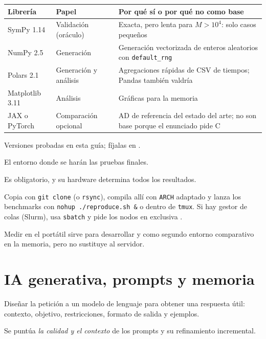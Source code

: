 \begin{center}\small
\begin{tabularx}{\linewidth}{@{}l l X@{}}
\toprule
Librería & Papel & Por qué sí o por qué no como base \\
\midrule
SymPy 1.14 & Validación (oráculo) & Exacta, pero lenta para $M>10^4$: solo casos pequeños \\
NumPy 2.5 & Generación & Generación vectorizada de enteros aleatorios con \texttt{default\_rng} \\
Polars 2.1 & Generación y análisis & Agregaciones rápidas de CSV de tiempos; Pandas también valdría \\
Matplotlib 3.11 & Análisis & Gráficas para la memoria \\
JAX o PyTorch & Comparación opcional & AD de referencia del estado del arte; no son base porque el enunciado pide C \\
\bottomrule
\end{tabularx}
\end{center}
Versiones probadas en esta guía; fíjalas en .

\que El entorno donde se harán las pruebas finales.

\porque Es obligatorio, y su hardware determina todos los resultados.

\como Copia con \texttt{git clone} (o \texttt{rsync}), compila allí con \texttt{ARCH} adaptado y lanza los benchmarks con \texttt{nohup ./reproduce.sh \&} o dentro de \texttt{tmux}. Si hay gestor de colas (Slurm), usa \texttt{sbatch} y pide los nodos en exclusiva \pv.

\alt Medir en el portátil sirve para desarrollar y como segundo entorno comparativo en la memoria, pero no sustituye al servidor.

\section{IA generativa, prompts y memoria}\label{tema:ia}

\que Diseñar la petición a un modelo de lenguaje para obtener una respuesta útil: contexto, objetivo, restricciones, formato de salida y ejemplos.

\porque Se puntúa \emph{la calidad y el contexto} de los prompts y su refinamiento incremental.

